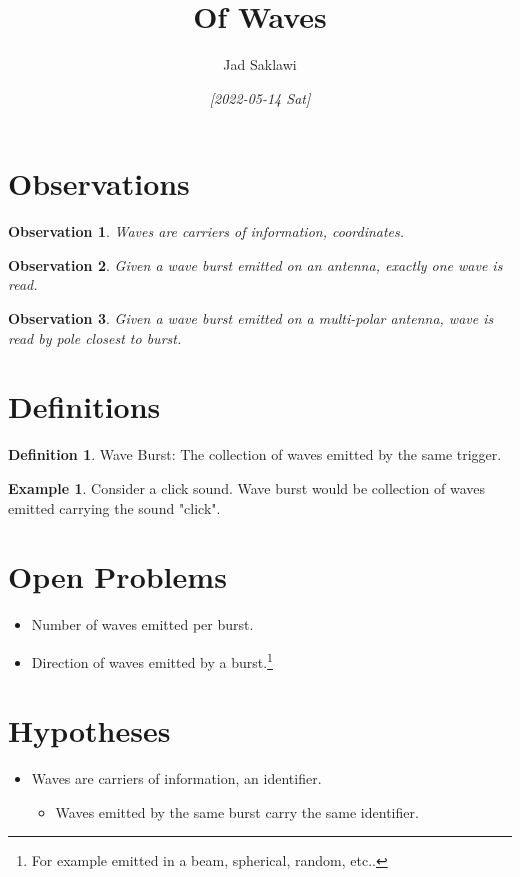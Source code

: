 \documentclass[11pt]{article}
\author{Jad Saklawi}
\date{\textit{[2022-05-14 Sat]}}
\title{Of Waves}
\begin{document}
\maketitle
\newtheorem*{observation}{Observation}
\theoremstyle{definition}
\newtheorem{definition}{Definition}[section]

\theoremstyle{example}
\newtheorem{example}{Example}[section]

\section{Observations}
\label{sec:orgc9cc621}

\begin{observation}
Waves are carriers of information, coordinates.
\end{observation}


\begin{observation}
Given a wave burst emitted on an antenna, exactly one wave is read. %
\end{observation}

\begin{observation}  %
Given a wave burst emitted on a multi-polar antenna, wave is read %
   by pole closest to burst. 
\end{observation} 

\section{Definitions}
\label{sec:org982f2cb}
\begin{definition}{Wave Burst:}
The collection of waves emitted by the same trigger.
\end{definition}
\begin{example}
Consider a click sound. Wave burst would be collection of waves emitted carrying the sound "click".
\end{example}
\section{Open Problems}
\label{sec:orga792950}
\begin{itemize}
\item Number of waves emitted per burst.
\item Direction of waves emitted by a burst.\footnote{For example emitted in a beam, spherical, random, etc..}
\end{itemize}
\section{Hypotheses}
\label{sec:orge7bdc69}
\begin{itemize}
\item Waves are carriers of information, an identifier.
\begin{itemize}
\item Waves emitted by the same burst carry the same identifier.
\end{itemize}
\end{itemize}
\end{document}
